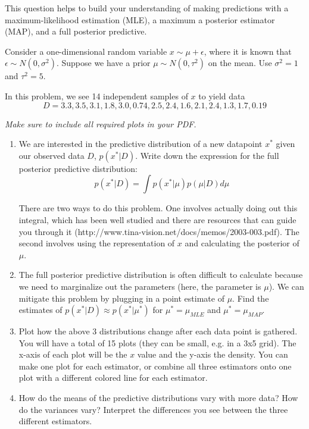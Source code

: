 \documentclass[submit]{harvardml}
\begin{document}
\begin{problem}

  This question helps to build your understanding of making
  predictions with a maximum-likelihood estimation (MLE), a maximum a
  posterior estimator (MAP), and a full posterior predictive.

  Consider a one-dimensional random variable $x \sim \mu + \epsilon$,
  where it is known that $\epsilon \sim N(0,\sigma^2)$.  Suppose we
  have a prior $\mu \sim N(0,\tau^2)$ on the mean.  Use $\sigma^2 = 1$
  and $\tau^2 = 5$.  

  In this problem, we see 14 independent samples of $x$ to yield data
  $$D = 3.3, 3.5, 3.1, 1.8, 3.0, 0.74, 2.5, 2.4, 1.6, 2.1, 2.4, 1.3, 1.7, 0.19$$
    
  \textit{Make sure to include all required plots in your PDF.}

\begin{enumerate}

\item We are interested in the predictive distribution of a new datapoint $x^*$ given our observed data $D$, $p(x^*|D)$.
  Write down the expression for the full posterior predictive distribution: $$p(x^*|D) = \int p(x^*|\mu)p(\mu|D) d\mu$$
  
  There are two ways to do this problem. One involves actually doing out this integral, which has been well studied and there are resources that can guide you through it (http://www.tina-vision.net/docs/memos/2003-003.pdf). The second involves using the representation of $x$ and calculating the posterior of $\mu$.
  
 \item The full posterior predictive distribution is often difficult to calculate because we need to marginalize out the parameters (here, the parameter is $\mu$). We can mitigate this problem by plugging in a point estimate of $\mu$. Find the estimates of $p(x^*|D) \approx p(x^*|\mu^*)$ for $\mu^* = \mu_{MLE}$ and $\mu^* = \mu_{MAP}$.
   
\item Plot how the above 3 distributions change after each data point is
  gathered.  You will have a total of 15 plots (they can be small,
  e.g. in a 3x5 grid).  The x-axis of each plot will be the $x$ value
  and the y-axis the density.  You can make one plot for each
  estimator, or combine all three estimators onto one plot with a
  different colored line for each estimator.
  
    
\item How do the means of the predictive distributions vary with more
  data?  How do the variances vary?  Interpret the differences you see
  between the three different estimators.
  

\end{enumerate}
\end{problem}
\end{document}
